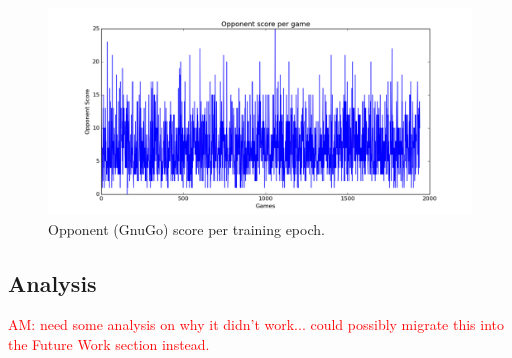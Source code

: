 \begin{figure}[h!]
\centering
\includegraphics[scale=0.5]{training_score.png}
\caption{Opponent (GnuGo) score per training epoch.}
\label{fig:score}
\end{figure}

\subsection*{Analysis}

\textcolor{red}{AM: need some analysis on why it didn't work... could possibly migrate this into the Future Work section instead.}